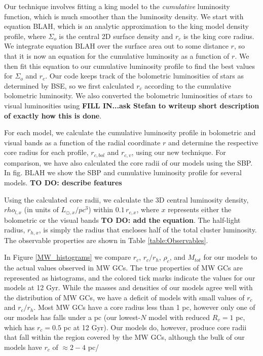 \documentclass[12pt,preprint]{aastex}
\begin{document}
Our technique involves fitting a king model to the \emph{cumulative} luminosity function, which is much smoother than the luminosity density.  We start with equation BLAH, which is an analytic approximation to the king model density profile, where $\Sigma_o$ is the central 2D surface density and $r_c$ is the king core radius. We integrate equation BLAH over the surface area out to some distance $r$, so that it is now an equation for the cumulative luminosity as a function of $r$. We then fit this equation to our cumulative luminosity profile to find the best values for $\Sigma_o$ and $r_c$.  Our code keeps track of the bolometric luminosities of stars as determined by BSE, so we first calculated $r_c$ according to the cumulative bolometric luminosity. We also converted the bolometric luminosities of stars to visual luminosities using \textbf{FILL IN...ask Stefan to writeup short description of exactly how this is done}.

For each model, we calculate the cumulative luminosity profile in bolometric and visual bands as a function of the radial coordinate $r$ and determine the respective core radius for each profile, $r_{c,bol}$ and $r_{c,v}$, using our new technique. For comparison, we have also calculated the core radii of our models using the SBP. In fig. BLAH we show the SBP and cumulative luminosity profile for several models. \textbf{TO DO: describe features}


Using the calculated core radii, we calculate the 3D central luminosity density, $rho_{l,x}$ (in units of $L_{\odot,x}/pc^3$) within $0.1\,r_{c,x}$, where $x$ represents either the bolometric or the visual bands \textbf{TO DO: add the equation}. The half-light radius, $r_{h,x}$, is simply the radius that encloses half of the total cluster luminosity. The observable properties are shown in Table \ref{table:Observables}.


In Figure \ref{MW_histograms} we compare $r_c$, $r_c / r_h$, $\rho_c$, and $M_{tot}$ 
for our models to the actual values observed in MW GCs. The true properties of MW 
GCs are represented as histograms, and the colored tick marks indicate the values for our 
models at 12 Gyr. While the masses and densities of our models agree well with the 
distribution of MW GCs, we have a deficit of models with small values of $r_c$ and $r_c / r_h$. 
Most MW GCs have a core radius less than 1 pc, however only one of our models has falls under
a pc (our lowest-$N$ model with reduced $R_v=1$ pc, which has $r_c=0.5$ pc at 12 Gyr). 
Our models do, however, produce core radii that fall within the region covered by the MW GCs,
although the bulk of our models have $r_c$ of $\approx 2-4$ pc/
\end{document}
